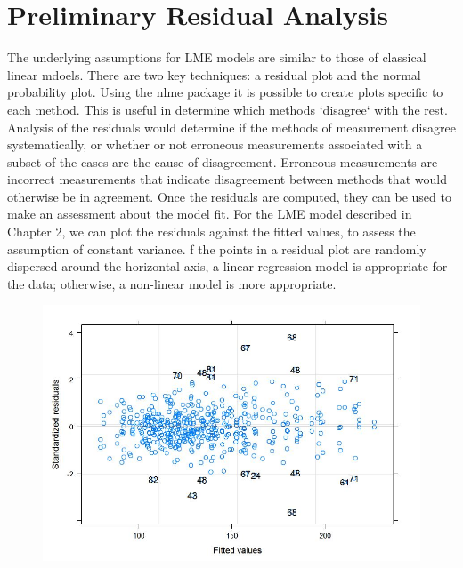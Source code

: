 \documentclass[12pt, a4paper]{report}
\theoremstyle{plain}
\theoremstyle{definition}
\theoremstyle{remark}
\begin{document}
	
	
	\section*{Preliminary Residual Analysis }
	
	The underlying assumptions for LME models are similar to those of classical linear mdoels. There are two key techniques: a residual plot and the normal probability plot. Using the nlme package it is possible to create plots specific to each method. This is useful in determine which methods `disagree` with the rest.
	Analysis of the residuals would determine if the methods of measurement disagree systematically, or whether or not erroneous measurements associated with a subset of the cases are the cause of disagreement.
	Erroneous measurements are incorrect measurements that indicate disagreement between methods that would otherwise be in agreement.
	Once the residuals are computed, they can be used to make an assessment about the model fit. For the LME model described in Chapter 2, we can plot the residuals against the fitted values, to assess the assumption of constant variance. f the points in a residual plot are randomly dispersed around the horizontal axis, a linear regression model is appropriate for the data; otherwise, a non-linear model is more appropriate.
	
	\begin{figure}[h!]
		\centering
		\includegraphics[width=0.9\linewidth]{images/Residuals-JS-Roy}
		\caption{}
		\label{fig:Residuals-JS-Roy}
	\end{figure}
	
\end{document}
